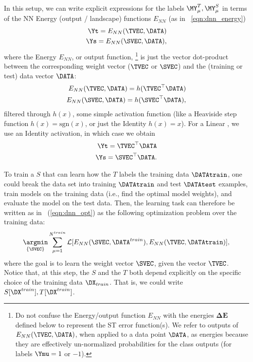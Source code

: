 In this setup, we can write explicit expressions for the labels $\MY^{T}_{\mu}, \MY^{S}_{\mu}$
  in terms of the \Perceptron NN Energy (output / landscape) functions $E_{NN}$ (as in \EQN~\ref{eqn:dnn_energy})
\begin{align}
\nonumber
\Yt=E_{NN}(\TVEC, \DATA) \\ 
\Ys=E_{NN}(\SVEC,\DATA) ,
\end{align}
where the \Perceptron Energy $E_{NN}$, or output function,%
\footnote{Do not confuse the Energy/output function $E_{NN}$ with the energies $\mathbf{\Delta E}$  defined below to represent the ST error function(s).  We refer to outputs of $E_{NN}(\TVEC,\DATA )$, when applied to a data point $\DATA$, as energies because they are effectively un-normalized probabilities for the class outputs (for labels $\Ymu=1$ or $-1$).  }
is just the vector dot-product between the corresponding \Perceptron weight vector ($\TVEC$ or $\SVEC$)
and the (training or test) data vector $\DATA$:
\begin{align}
\label{eqn:ENN}
\nonumber
E_{NN}(\TVEC, \DATA)=h(\TVEC^{\top}\DATA) \\ 
E_{NN}(\SVEC, \DATA)=h(\SVEC^{\top}\DATA) ,
\end{align}
filtered through $h(x)$, some simple activation function (like a Heaviside step function $h(x)=\mbox{sgn}(x)$, or just the Identity $h(x)=x$).
For a Linear \Perceptron, we use an Identity activation, in which case we obtain
\begin{align}
\nonumber
\Yt=\TVEC^{\top}\DATA \\ 
\Ys=\SVEC^{\top}\DATA .
\end{align}


To train a \Student \Perceptron $S$ that can learn how the \Teacher \Perceptron $T$ labels the training data $\DATAtrain$, 
one could break the data set into training $\DATAtrain$ and test $\DATAtest$ examples, 
train models on the training data (i.e., find the optimal model weights), 
and evaluate the model on the test data.
Then, the \Student learning task can therefore be written as in \EQN~(\ref{eqn:dnn_opt}) as the following optimization problem over the training data:
\begin{align}
\underset{\{\SVEC\}}{\argmin}\sum_{\mu=1}^{N^{train}}\mathcal{L}[E_{NN}(\SVEC,\DATA^{train}),E_{NN}(\TVEC,\DATAtrain)]   ,
\label{eqn:student-learning-task}
\end{align}
where the goal is to learn the \Student weight vector $\SVEC$, given the \Teacher vector $\TVEC$.
Notice that, at this step, the \Student $S$ and the \Teacher $T$ both depend explicitly on the specific choice of the training data $\DX_{train}$.  
That is, we could write $S[\DX^{train}], T[\DX^{train}]$.


